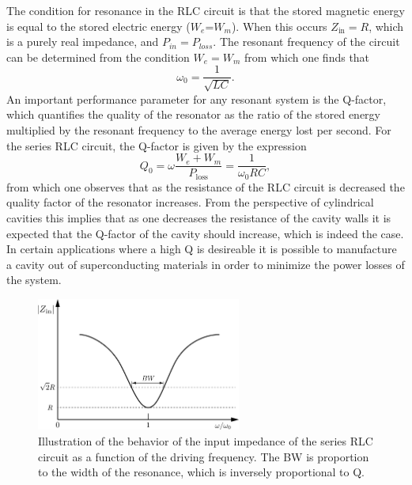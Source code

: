 The condition for resonance in the RLC circuit is that the stored magnetic energy is equal to the stored electric energy ($W_e$=$W_m$). When this occurs $Z_\mathrm{in}=R$, which is a purely real impedance, and $P_{in}=P_{loss}$. The resonant frequency of the circuit can be determined from the condition $W_e=W_m$ from which one finds that 
\begin{equation}
    \omega_0=\frac{1}{\sqrt{LC}}.
\end{equation}
An important performance parameter for any resonant system is the Q-factor, which quantifies the quality of the resonator as the ratio of the stored energy multiplied by the resonant frequency to the average energy lost per second. For the series RLC circuit, the Q-factor is given by the expression 
\begin{equation}
    Q_0=\omega\frac{W_e+W_m}{P_\mathrm{loss}}=\frac{1}{\omega_0RC},
\end{equation}
from which one observes that as the resistance of the RLC circuit is decreased the quality factor of the resonator increases. From the perspective of cylindrical cavities this implies that as one decreases the resistance of the cavity walls it is expected that the Q-factor of the cavity should increase, which is indeed the case. In certain applications where a high Q is desireable it is possible to manufacture a cavity out of superconducting materials in order to minimize the power losses of the system.

\begin{figure}[htbp]
    \centering
    \includegraphics*[width=0.6\textwidth]{figs/Chapter-6/230607_rlc_resonance.png}
    \caption{\label{fig:chap6-rlc-resonance} Illustration of the behavior of the input impedance of the series RLC circuit as a function of the driving frequency. The BW is proportion to the width of the resonance, which is inversely proportional to Q.}
\end{figure}


